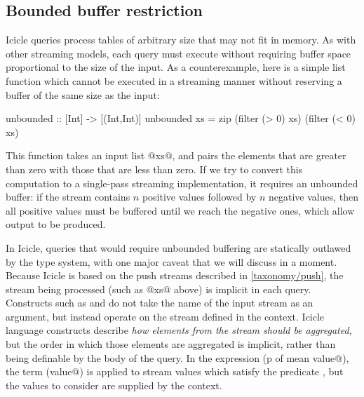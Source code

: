 \subsection{Bounded buffer restriction}
\label{icicle:s:IcicleSource:bounded}
Icicle queries process tables of arbitrary size that may not fit in memory.
As with other streaming models, each query must execute without requiring buffer space proportional to the size of the input.
As a counterexample, here is a simple list function which cannot be executed in a streaming manner without reserving a buffer of the same size as the input:
\begin{haskell}
unbounded :: [Int] -> [(Int,Int)]
unbounded xs = zip (filter (> 0) xs) (filter (< 0) xs)
\end{haskell}

This function takes an input list @xs@, and pairs the elements that are greater than zero with those that are less than zero.
If we try to convert this computation to a single-pass streaming implementation, it requires an unbounded buffer: if the stream contains $n$ positive values followed by $n$ negative values, then all positive values must be buffered until we reach the negative ones, which allow output to be produced.


In Icicle, queries that would require unbounded buffering are statically outlawed by the type system, with one major caveat that we will discuss in a moment.
Because Icicle is based on the push streams described in \cref{taxonomy/push}, the stream being processed (such as @xs@ above) is implicit in each query.
Constructs such as \Ic@filter@ and \Ic@fold@ do not take the name of the input stream as an argument, but instead operate on the stream defined in the context.
Icicle language constructs describe \emph{how elements from the stream should be aggregated}, but the order in which those elements are aggregated is implicit, rather than being definable by the body of the query.
In the expression (\Ic@filter p of mean value@), the term (\Ic@mean value@) is applied to stream values which satisfy the predicate \Ic@p@, but the values to consider are supplied by the context.

